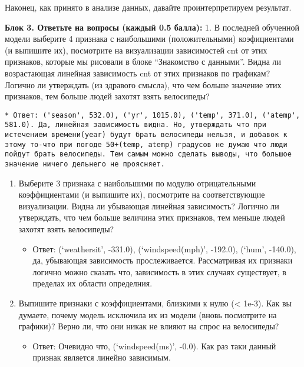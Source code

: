 \documentclass[11pt]{article}
\providecommand{\tightlist}{%
      \setlength{\itemsep}{0pt}\setlength{\parskip}{0pt}}
\begin{document}
    Наконец, как принято в анализе данных, давайте проинтерпретируем
результат.

    \textbf{Блок 3. Ответьте на вопросы (каждый 0.5 балла):} 1. В последней
обученной модели выберите 4 признака с наибольшими (положительными)
коэфициентами (и выпишите их), посмотрите на визуализации зависимостей
cnt от этих признаков, которые мы рисовали в блоке ``Знакомство с
данными''. Видна ли возрастающая линейная зависимость cnt от этих
признаков по графикам? Логично ли утверждать (из здравого смысла), что
чем больше значение этих признаков, тем больше людей захотят взять
велосипеды?

\begin{verbatim}
* Ответ: ('season', 532.0), ('yr', 1015.0), ('temp', 371.0), ('atemp', 581.0). Да, линейная зависимость видна. Но, утверждать что при истечением времени(year) будут брать велосипеды нельзя, и добавок к этому то-что при погоде 50+(temp, atemp) градусов не думаю что люди пойдут брать велосипеды. Тем самым можно сделать выводы, что большое значение ничего дельнего не проясняет.
\end{verbatim}

\begin{enumerate}
\def\labelenumi{\arabic{enumi}.}
\item
  Выберите 3 признака с наибольшими по модулю отрицательными
  коэффициентами (и выпишите их), посмотрите на соответствующие
  визуализации. Видна ли убывающая линейная зависимость? Логично ли
  утверждать, что чем больше величина этих признаков, тем меньше людей
  захотят взять велосипеды?

  \begin{itemize}
  \tightlist
  \item
    Ответ: (`weathersit', -331.0), (`windspeed(mph)', -192.0), (`hum',
    -140.0), да, убывающая зависимость прослеживается. Рассматривая их
    признаки логично можно сказать что, зависимость в этих случаях
    существует, в пределах их области определния.
  \end{itemize}
\item
  Выпишите признаки с коэффициентами, близкими к нулю (\textless{}
  1e-3). Как вы думаете, почему модель исключила их из модели (вновь
  посмотрите на графики)? Верно ли, что они никак не влияют на спрос на
  велосипеды?

  \begin{itemize}
  \tightlist
  \item
    Ответ: Очевидно что, (`windspeed(ms)', -0.0). Как раз таки данный
    признак является линейно зависимым.
  \end{itemize}
\end{enumerate}
\end{document}
